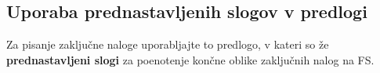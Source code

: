 \subsection{Uporaba prednastavljenih slogov v predlogi}\label{sec:prednastavitve}
Za pisanje zaključne naloge uporabljajte to predlogo, v kateri so že \textbf{prednastavljeni slogi} za poenotenje končne oblike zaključnih nalog na FS.
%
%
%
%
%
%
%
%
%
%
%
%
%
%
